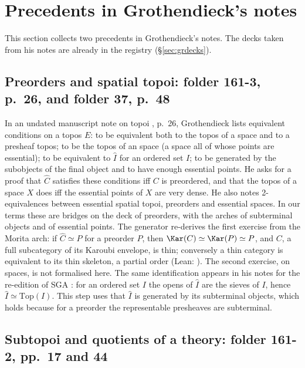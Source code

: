 \section{Precedents in Grothendieck's notes}\label{sec:precedents}

This section collects two precedents in Grothendieck's notes. The decks taken from his notes are already in the registry (\S\ref{sec:grdecks}).

\subsection{Preorders and spatial topoi: folder 161-3, p.~26, and folder 37, p.~48}

In an undated manuscript note on topoi \cite{grothendieck-161-3}, p.~26, Grothendieck lists equivalent conditions on a topos $E$: to be equivalent both to the topos of a space and to a presheaf topos; to be the topos of an  space (a space all of whose points are essential); to be equivalent to $\widehat I$ for an ordered set $I$; to be generated by the subobjects of the final object and to have enough essential points. He asks for a proof that $\widehat C$ satisfies these conditions iff $C$ is preordered, and that the topos of a space $X$ does iff the essential points of $X$ are very dense. He also notes 2-equivalences between essential spatial topoi, preorders and essential spaces. In our terms these are bridges on the deck of preorders, with the arches of subterminal objects and of essential points. The generator re-derives the first exercise from the Morita arch: if $\widehat C\simeq\widehat P$ for a preorder $P$, then $\Kar(C)\simeq\Kar(P)\simeq P$, and $C$, a full subcategory of its Karoubi envelope, is thin; conversely a thin category is equivalent to its thin skeleton, a partial order (Lean: ). The second exercise, on spaces, is not formalised here. The same identification appears in his notes for the re-edition of SGA \cite[p.~48]{grothendieck-37}: for an ordered set $I$ the opens of $\widehat I$ are the sieves of $I$, hence $\widehat I\simeq\mathrm{Top}(I)$. This step uses that $\widehat I$ is generated by its subterminal objects, which holds because for a preorder the representable presheaves are subterminal.

\subsection{Subtopoi and quotients of a theory: folder 161-2, pp.~17 and 44}

